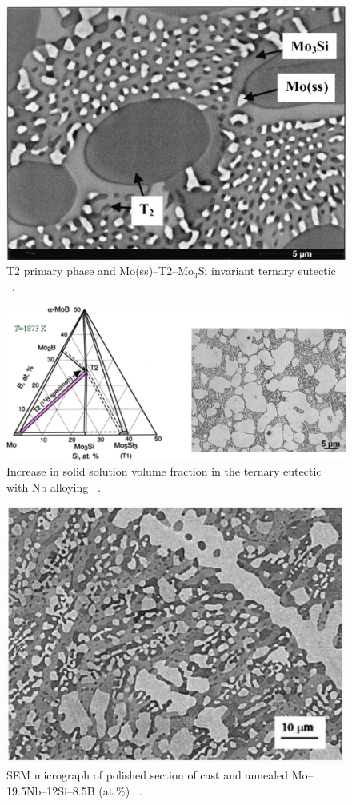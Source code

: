 %
\begin{figure}[H]
\begin{center}
\includegraphics[width=.5\textwidth]{MoSiB_witheutectic}
\caption{T2 primary phase and Mo(ss)--T2--Mo$_3$Si invariant ternary eutectic ~\cite{perepezko01}.}
\label{fig:MoSiB_witheutectic}
\end{center}
\end{figure}
\vspace{.7cm} 
%
\begin{figure}[H]
\begin{center}
\includegraphics[width=\textwidth]{MoSiB_withNb}
\caption{Increase in solid solution volume fraction in the ternary eutectic with Nb alloying ~\cite{perepezko01}.}\label{fig:MoSiB_withNb}
\end{center}
\end{figure}
%
\begin{figure}[H]
\begin{center}
\includegraphics[width=.5\textwidth]{Mo19Nb12Si8B}
\caption{SEM micrograph of polished section of cast and annealed Mo--19.5Nb--12Si--8.5B (at.\%) ~\cite{perepezko01}.}\label{fig:Mo19Nb12Si8B}
\end{center}
\end{figure} 
%
